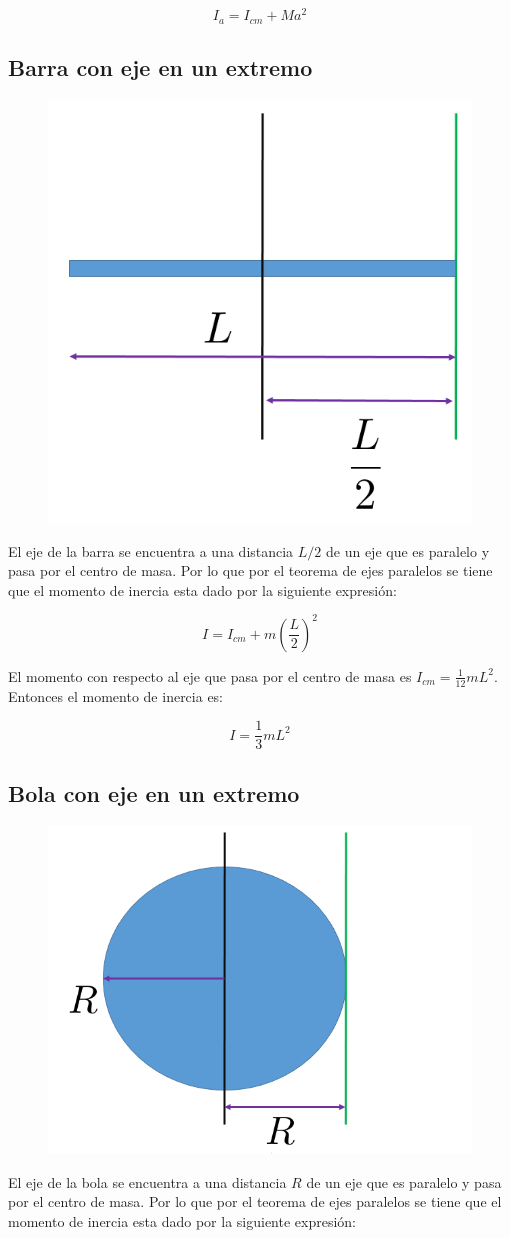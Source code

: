 \documentclass[a4paper,11pt]{article}
\theoremstyle{mytheor}
\begin{document}
 $$ I_{a} = I_{cm} + M a^2$$


\subsection{Barra con eje en un extremo}

\begin{figure}[h]
	\includegraphics[width=0.4\linewidth]{paralelobarra}
	\label{fcN4}
\end{figure}

El eje de la barra se encuentra a una distancia $L/2$ de un eje que es paralelo y pasa por el centro de masa. Por lo que por el teorema de ejes paralelos se tiene que el momento de inercia esta dado por la siguiente expresión:

$$ I = I_{cm} + m \left(\frac{L}{2}\right)^2$$

El momento con respecto al eje que pasa por el centro de masa es $I_{cm} =\frac{1}{12} m L^2$. Entonces el momento de inercia es:

$$ I = \frac{1}{3} m L^2$$

\subsection{Bola con eje en un extremo}

\begin{figure}[h]
	\includegraphics[width=0.4\linewidth]{paralelobola}
	\label{fcN4}
\end{figure}

El eje de la bola se encuentra a una distancia $R$ de un eje que es paralelo y pasa por el centro de masa. Por lo que por el teorema de ejes paralelos se tiene que el momento de inercia esta dado por la siguiente expresión:
\end{document}
